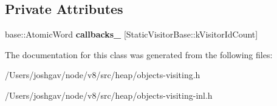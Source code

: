 \subsection*{Private Attributes}
\begin{DoxyCompactItemize}
\item 
base\+::\+Atomic\+Word {\bfseries callbacks\+\_\+} \mbox{[}Static\+Visitor\+Base\+::k\+Visitor\+Id\+Count\mbox{]}\hypertarget{classv8_1_1internal_1_1_visitor_dispatch_table_a08b61fcb4fadcab1e44e98f3cef574e1}{}\label{classv8_1_1internal_1_1_visitor_dispatch_table_a08b61fcb4fadcab1e44e98f3cef574e1}

\end{DoxyCompactItemize}


The documentation for this class was generated from the following files\+:\begin{DoxyCompactItemize}
\item 
/\+Users/joshgav/node/v8/src/heap/objects-\/visiting.\+h\item 
/\+Users/joshgav/node/v8/src/heap/objects-\/visiting-\/inl.\+h\end{DoxyCompactItemize}
